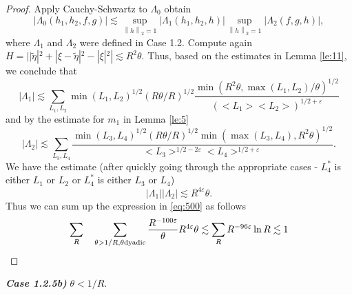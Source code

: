 \documentclass[draft,11pt,leqno]{amsart}
\newcommand{\q}{\quad}
\newcommand{\norm}[2]{{\left\| #1 \right\|}_{#2}}
\newcommand{\ve}{\varepsilon}
\newcommand{\La}{\Lambda}
\newcommand{\suml}{\sum\limits}
\newcommand{\supl}{\sup\limits}
\newcommand{\f}{\displaystyle\frac}
\newcommand{\lfour}{{L_4^{*}}}
\begin{document}
\begin{proof}
Apply Cauchy-Schwartz to $\La_0$ obtain
$$
|\La_0(h_1,h_2,f,g)|\lesssim \supl_{\norm{h}{2}=1}|\La_1(h_1,h_2,h)|\supl_{\norm{h}{2}=1}|\La_2(f,g,h)|,
$$
where
$\La_1$ and $\La_2$ were defined in Case 1.2.
Compute again  $H=||\tilde{\eta}|^2+|\xi-\tilde{\eta}|^2-|\xi|^2|\lesssim R^2\theta$.
Thus, based on  the estimates  in Lemma \ref{le:11}, we conclude that
 $$ |\La_1|\lesssim
\suml_{L_1,L_2}\min(L_1, L_2)^{1/2}(R\theta/R)^{1/2}\f{\min(R^2\theta,\max(L_1,L_2)/\theta)^{1/2}}{(<L_1><L_2>)^{1/2+\ve}}
$$ and by the estimate for $m_1$ in Lemma \ref{le:5} $$
|\La_2|\lesssim\suml_{L_3,L_4}
\f{\min(L_3,L_4)^{1/2}(R\theta/R)^{1/2}\min(\max(L_3,L_4),R^2\theta)^{1/2}}{<L_3>^{1/2-2\ve}<L_4>^{1/2+\ve}}.
$$ 
We have the estimate (after quickly going through the appropriate cases - $\lfour$ is either $L_1$ or $L_2$ or $\lfour$ 
is either $L_3$ or $L_4$)
$$|\La_1||\La_2|\lesssim
R^{4\ve}\theta.$$ 
Thus we can sum up the expression in \eqref{eq:500} as follows
$$
\suml_{R}\q\suml_{\theta>1/R, \theta\textup{dyadic}} \f{R^{-100\ve}}{\theta} R^{4\ve}\theta\lesssim \suml_{R} 
R^{-96\ve}\ln{R}\lesssim 1
$$
\end{proof}
{\it\bf Case 1.2.5b)} $\theta<1/R$. 
\end{document}
